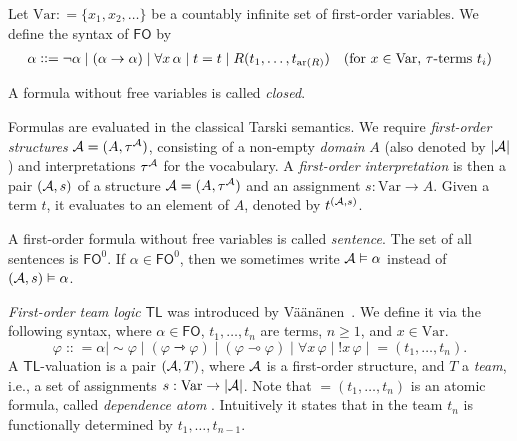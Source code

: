 \documentclass[a4paper,english,fleqn,11pt,final]{scrartcl}
\makeatletter
\newcommand{\ie}{i.e.\@\xspace}
\newcommand{\mathCommandFont}[1]{\mathrm{#1}}
\newcommand{\size}[1]{{\protect\ensuremath{\vert\nobreak#1\nobreak\vert}}}
\newcommand{\arity}[1]{{\protect\ensuremath{\mathCommandFont{ar}(#1)}}}
\newcommand{\negg}{{\sim}}
\newcommand{\dep}[1]{{=\!\!(#1)}}
\newcommand{\logic}[1]{\ensuremath{\mathsf{#1}}\xspace}
\newcommand{\FO}{\logic{FO}}
\newcommand{\TL}{\logic{TL}}
\newcommand{\Var}{\mathrm{Var}}
\newcommand{\calA}{\protect\ensuremath{\mathcal{A}}}
\providecommand{\dfn}{\mathrel{\mathop:}=}
\providecommand{\ddfn}{\mathrel{\mathop{{\mathop:}{\mathop:}}}=}
\newcommand{\imp}{\rightarrow}
\newcommand{\limp}{\multimap}
\newcommand{\timp}{\rightarrowtriangle}
\DeclareMathOperator{\shriek}{!}
\theoremstyle{plain}
\theoremstyle{definition}
\makeatother
\begin{document}
Let $\Var \dfn \{ x_1, x_2, \ldots \}$ be a countably infinite set of first-order variables.
We define the syntax of $\FO$ by
\begin{align*}
\alpha \ddfn \neg \alpha \mid (\alpha \imp \alpha) \mid \forall x \,\alpha \mid t = t \mid R(t_1,\ldots,t_{\arity{R}})\quad\text{(for $x \in \Var$, $\tau$-terms $t_i$)}
\end{align*}

A formula without free variables is called \emph{closed}.

Formulas are evaluated in the classical Tarski semantics.
We require \emph{first-order structures} $\calA = (A, \tau^\calA)$, consisting of a non-empty \emph{domain} $A$ (also denoted by $|\calA|$) and interpretations $\tau^\calA$ for the vocabulary.
A \emph{first-order interpretation} is then a pair $(\calA, s)$ of a structure $\calA = (A, \tau^\calA)$ and an assignment $s \colon \Var \to A$.
Given a term $t$, it evaluates to an element of $A$, denoted by $t^{(\calA,s)}$.

A first-order formula without free variables is called \emph{sentence}.
The set of all sentences is $\FO^0$.
If $\alpha \in \FO^0$, then we sometimes write $\calA \vDash \alpha$ instead of $(\calA,s) \vDash \alpha$.

\smallskip

\emph{First-order team logic} $\TL$ was introduced by Väänänen~\cite{vaananen_dependence_2007}.
We define it via the following syntax, where $\alpha \in \FO$, $t_1,\ldots,t_n$ are terms, $n \geq 1$, and $x \in \Var$.
\[
\varphi \ddfn \alpha \mid \negg \varphi \mid (\varphi \timp \varphi) \mid (\varphi \limp \varphi) \mid \forall x \,\varphi \mid \shriek x \,\varphi \mid \dep{t_1,\ldots,t_n}\text{.}
\]
A $\TL$-valuation is a pair $(\calA,T)$, where $\calA$ is a first-order structure, and $T$ a \emph{team}, \ie, a set of assignments $s : \Var \to \size{\calA}$.
Note that $\dep{t_1,\ldots,t_n}$ is an atomic formula, called \emph{dependence atom} \cite{vaananen_dependence_2007}.
Intuitively it states that in the team $t_n$ is functionally determined by $t_1,\ldots,t_{n-1}$.
\end{document}
